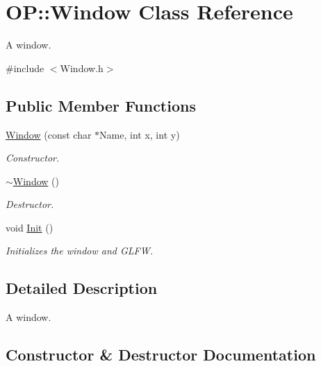 \hypertarget{class_o_p_1_1_window}{}\section{OP\+::Window Class Reference}
\label{class_o_p_1_1_window}


A window.  




{\ttfamily \#include $<$Window.\+h$>$}

\subsection*{Public Member Functions}
\begin{DoxyCompactItemize}
\item 
\mbox{\hyperlink{class_o_p_1_1_window_ad02cfa0e0861d638fbe1b1adc6a64b02}{Window}} (const char $\ast$Name, int x, int y)
\begin{DoxyCompactList}\small\item\em Constructor. \end{DoxyCompactList}\item 
\mbox{\hyperlink{class_o_p_1_1_window_a06adc304f53e66b7d7be44e16b55dc46}{$\sim$\+Window}} ()
\begin{DoxyCompactList}\small\item\em Destructor. \end{DoxyCompactList}\item 
void \mbox{\hyperlink{class_o_p_1_1_window_a452317c004aabcfdb3a3e9406df86ff1}{Init}} ()
\begin{DoxyCompactList}\small\item\em Initializes the window and G\+L\+FW. \end{DoxyCompactList}\end{DoxyCompactItemize}


\subsection{Detailed Description}
A window. 

\subsection{Constructor \& Destructor Documentation}
\mbox{\label{class_o_p_1_1_window_ad02cfa0e0861d638fbe1b1adc6a64b02}} 
